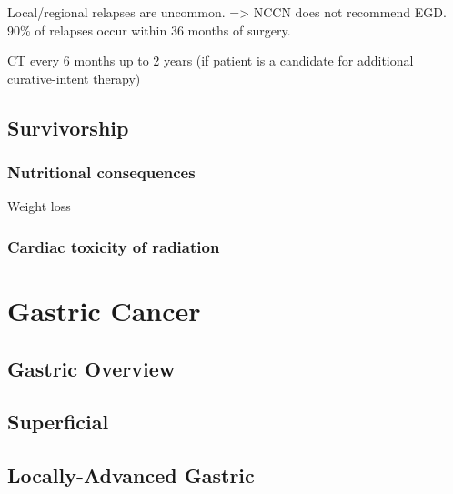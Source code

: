 \documentclass[
]{book}
\begin{document}
Local/regional relapses are uncommon. \citep{dorth2099} \citep{oppedijk385} \citep{sudo4306} =\textgreater{} NCCN does not recommend EGD. 90\% of relapses occur within 36 months of surgery.

CT every 6 months up to 2 years (if patient is a candidate for additional curative-intent therapy)

\hypertarget{eso_survivorship}{%
\chapter{Survivorship}\label{eso_survivorship}}

\hypertarget{nutritional-consequences}{%
\section{Nutritional consequences}\label{nutritional-consequences}}

\citep{baker987}

Weight loss
\citep{martin1308}
\citep{ouattara1088}

\hypertarget{cardiac-toxicity-of-radiation}{%
\section{Cardiac toxicity of radiation}\label{cardiac-toxicity-of-radiation}}

\citep{beukema85} \citep{frandsen516} \citep{gharzaie0158916}

\hypertarget{part-gastric-cancer}{%
\part*{Gastric Cancer}\label{part-gastric-cancer}}

\hypertarget{gastric-overview}{%
\chapter{Gastric Overview}\label{gastric-overview}}

\hypertarget{gast_superficial}{%
\chapter{Superficial}\label{gast_superficial}}

\hypertarget{locally-advanced-gastric}{%
\chapter{Locally-Advanced Gastric}\label{locally-advanced-gastric}}
\end{document}
